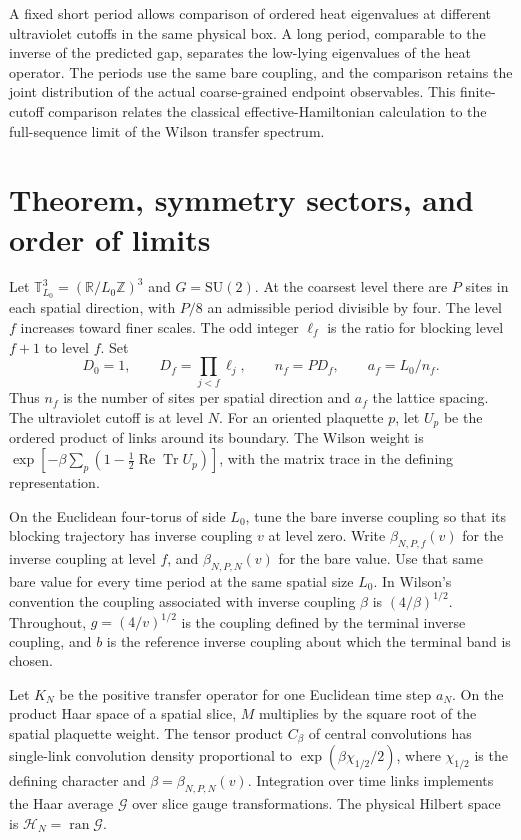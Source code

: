 \documentclass[11pt,a4paper]{article}
\numberwithin{equation}{section}
\newcommand{\SU}{\mathrm{SU}}
\newcommand{\Tr}{\operatorname{Tr}}
\begin{document}
A fixed short period allows comparison of ordered heat eigenvalues at different ultraviolet cutoffs in the same physical box. A long period, comparable to the inverse of the predicted gap, separates the low-lying eigenvalues of the heat operator. The periods use the same bare coupling, and the comparison retains the joint distribution of the actual coarse-grained endpoint observables. This finite-cutoff comparison relates the classical effective-Hamiltonian calculation to the full-sequence limit of the Wilson transfer spectrum.

\section{Theorem, symmetry sectors, and order of limits}
\label{sec:main}

Let \(\mathbb T^3_{L_0}=(\mathbb R/L_0\mathbb Z)^3\) and \(G=\SU(2)\). At the coarsest level there are \(P\) sites in each spatial direction, with \(P/8\) an admissible period divisible by four. The level \(f\) increases toward finer scales. The odd integer \(\ell_f\) is the ratio for blocking level \(f+1\) to level \(f\). Set
\[
 D_0=1,\qquad D_f=\prod_{j<f}\ell_j,\qquad n_f=PD_f,\qquad a_f=L_0/n_f.
\]
Thus \(n_f\) is the number of sites per spatial direction and \(a_f\) the lattice spacing. The ultraviolet cutoff is at level \(N\). For an oriented plaquette \(p\), let \(U_p\) be the ordered product of links around its boundary. The Wilson weight is \(\exp[-\beta\sum_p(1-\tfrac12\operatorname{Re}\Tr U_p)]\), with the matrix trace in the defining representation.

On the Euclidean four-torus of side \(L_0\), tune the bare inverse coupling so that its blocking trajectory has inverse coupling \(v\) at level zero. Write \(\beta_{N,P,f}(v)\) for the inverse coupling at level \(f\), and \(\beta_{N,P,N}(v)\) for the bare value. Use that same bare value for every time period at the same spatial size \(L_0\). In Wilson's convention the coupling associated with inverse coupling \(\beta\) is \((4/\beta)^{1/2}\). Throughout, \(g=(4/v)^{1/2}\) is the coupling defined by the terminal inverse coupling, and \(b\) is the reference inverse coupling about which the terminal band is chosen.

Let \(K_N\) be the positive transfer operator for one Euclidean time step \(a_N\). On the product Haar space of a spatial slice, \(M\) multiplies by the square root of the spatial plaquette weight. The tensor product \(C_\beta\) of central convolutions has single-link convolution density proportional to \(\exp(\beta\chi_{1/2}/2)\), where \(\chi_{1/2}\) is the defining character and \(\beta=\beta_{N,P,N}(v)\). Integration over time links implements the Haar average \(\mathcal G\) over slice gauge transformations. The physical Hilbert space is \(\mathcal H_N=\operatorname{ran}\mathcal G\).
\end{document}
